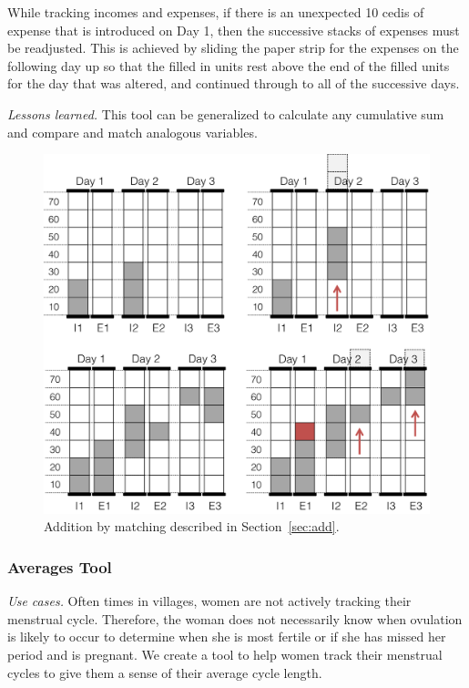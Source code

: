 \documentclass{sig-alternate}
\begin{document}
While tracking incomes and expenses, if there is an unexpected 10 cedis of expense that is introduced on Day 1, then the successive stacks of expenses must be readjusted. This is achieved by sliding the paper strip for the expenses on the following day up so that the filled in units rest above the end of the filled units for the day that was altered, and continued through to all of the successive days.

\emph{Lessons learned.} This tool can be generalized to calculate any cumulative sum and compare and match analogous variables.

\begin{figure}
\centering
\includegraphics[width=.9\linewidth]{img/add.png}
\caption{Addition by matching described in Section~\ref{sec:add}.}
\label{fig:add}
\end{figure}

\subsubsection{Averages Tool}
\label{sec:average}

\emph{Use cases.} 
Often times in villages, women are not actively tracking their menstrual cycle. Therefore, the woman does not necessarily know when ovulation is likely to occur to determine when she is most fertile or if she has missed her period and is pregnant. We create a tool to help women track their menstrual cycles to give them a sense of their average cycle length.
\end{document}

